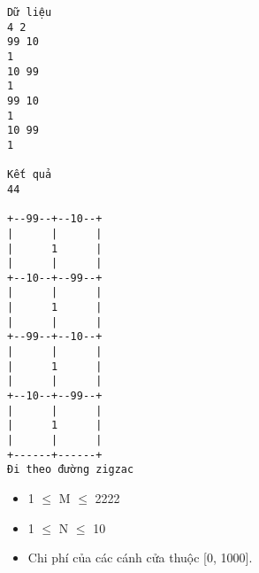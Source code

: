 \begin{verbatim}
Dữ liệu
4 2
99 10
1
10 99
1
99 10
1
10 99
1

Kết quả
44

+--99--+--10--+
|      |      |
|      1      |
|      |      |
+--10--+--99--+
|      |      |
|      1      |
|      |      |
+--99--+--10--+
|      |      |
|      1      |
|      |      |
+--10--+--99--+
|      |      |
|      1      |
|      |      |
+------+------+
Đi theo đường zigzac
\end{verbatim}
\begin{itemize}
	\item 1  $\le$  M  $\le$  2222
	\item 1  $\le$  N  $\le$  10
	\item Chi phí của các cánh cửa thuộc [0, 1000].
\end{itemize}